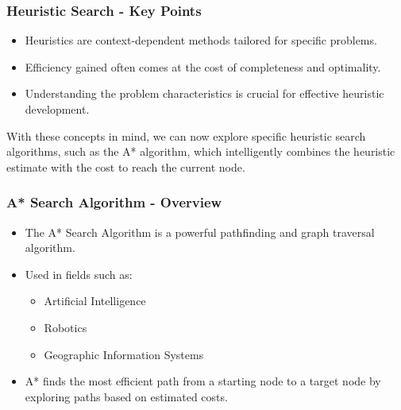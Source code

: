 \documentclass[aspectratio=169]{beamer}
\begin{document}
\begin{frame}[fragile]
    \frametitle{Heuristic Search - Key Points}
    
    \begin{itemize}
        \item Heuristics are context-dependent methods tailored for specific problems.
        \item Efficiency gained often comes at the cost of completeness and optimality.
        \item Understanding the problem characteristics is crucial for effective heuristic development.
    \end{itemize}

    With these concepts in mind, we can now explore specific heuristic search algorithms, such as the A* algorithm, which intelligently combines the heuristic estimate with the cost to reach the current node.
\end{frame}

\begin{frame}[fragile]
    \frametitle{A* Search Algorithm - Overview}
    \begin{itemize}
        \item The A* Search Algorithm is a powerful pathfinding and graph traversal algorithm.
        \item Used in fields such as:
        \begin{itemize}
            \item Artificial Intelligence
            \item Robotics
            \item Geographic Information Systems
        \end{itemize}
        \item A* finds the most efficient path from a starting node to a target node by exploring paths based on estimated costs.
    \end{itemize}
\end{frame}
\end{document}

